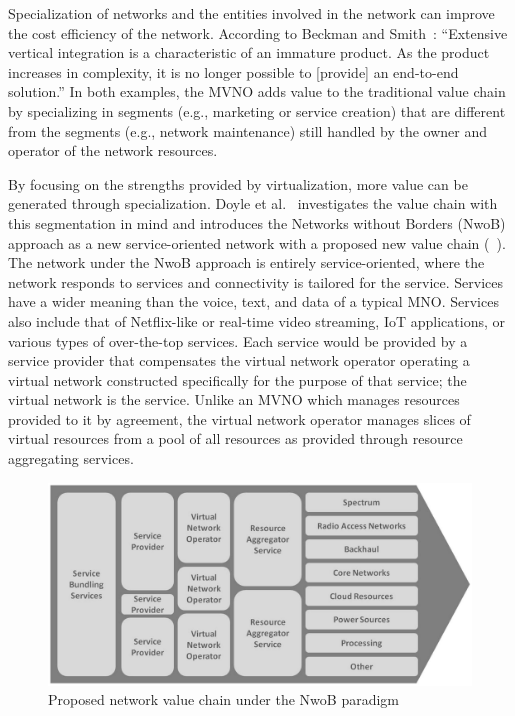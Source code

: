 \documentclass[12pt,dvipsnames]{report}
\begin{document}
Specialization of networks and the entities involved in the network can improve the cost efficiency of the network.  According to Beckman and Smith~\cite{1421931}: ``Extensive vertical integration is a characteristic of an immature product.  As the product increases in complexity, it is no longer possible to [provide] an end-to-end solution.'' In both examples, the MVNO adds value to the traditional value chain by specializing in segments (e.g., marketing or service creation) that are different from the segments (e.g., network maintenance) still handled by the owner and operator of the network resources.

By focusing on the strengths provided by virtualization, more value can be generated through specialization.  Doyle et al.~\cite{6737248} investigates the value chain with this segmentation in mind and introduces the Networks without Borders (NwoB) approach as a new service-oriented network with a proposed new value chain (~\cite{6737248}).  The network under the NwoB approach is entirely service-oriented, where the network responds to services and connectivity is tailored for the service.  Services have a wider meaning than the voice, text, and data of a typical MNO.  Services also include that of Netflix-like or real-time video streaming, IoT applications, or various types of over-the-top services.  Each service would be provided by a service provider that compensates the virtual network operator operating a virtual network constructed specifically for the purpose of that service; the virtual network is the service.  Unlike an MVNO which manages resources provided to it by agreement, the virtual network operator manages slices of virtual resources from a pool of all resources as provided through resource aggregating services.

\begin{figure}[ht]
	\centering
	\includegraphics[width=1\linewidth]{NwoBValueChain}
	\caption[Proposed network value chain under the NwoB paradigm]{Proposed network value chain under the NwoB paradigm~\cite{6737248}}
	\label{fig:NwoBValueChain}
\end{figure}
\end{document}
